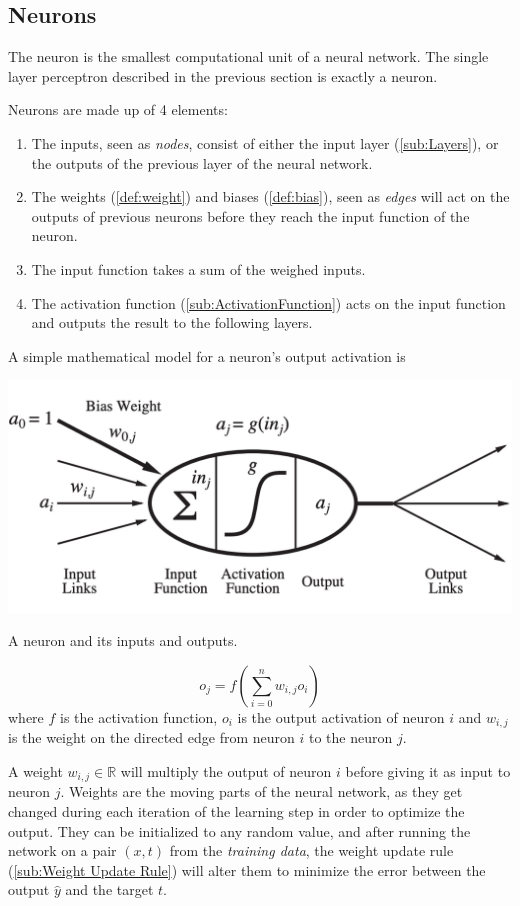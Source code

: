 \documentclass[nobib]{tufte-handout} %
\begin{document}
 \subsection{Neurons}%
  \label{sub:Neurons}
The neuron is the smallest computational unit of a neural network. The single layer perceptron described in the previous section is exactly a neuron.  
\begin{definition}[Neurons]
  Neurons are made up of 4 elements: 
  \begin{enumerate}
    \item The inputs, seen as \textit{nodes}, consist of either the input layer (\autoref{sub:Layers}), or the outputs of the previous layer of the neural network. 
    \item The weights (\autoref{def:weight}) and biases (\autoref{def:bias}), seen as \textit{edges} will act on the outputs of previous neurons before they reach the input function of the neuron. 
    \item The input function takes a sum of the weighed inputs. 
    \item The activation function (\autoref{sub:ActivationFunction}) acts on the input function and outputs the result to the following layers. 
  \end{enumerate}
   A simple mathematical model for a neuron's output activation is \citep{book:AIModernApp}
\begin{marginfigure}
  \includegraphics{Neuron}
  \label{Neuron}
  \caption{A neuron and its inputs and outputs.}
\end{marginfigure}
  $$o_j = f \left( \sum^{n}_{i=0}w_{i,j} o_i  \right)$$
  where $f$ is the activation function, $o_i$ is the output activation of neuron $i$ and $w_{i,j}$ is the weight on the directed edge from neuron $i$ to the neuron $j$. 
\end{definition}
\begin{definition}[Weights]\label{def:weight}
  A weight $w_{i,j} \in \mathbb{R}$ will multiply the output of neuron $i$ before giving it as input to neuron $j$. Weights are the moving parts of the neural network, as they get changed during each iteration of the learning step in order to optimize the output. They can be initialized to any random value, and after running the network on a pair $(x,t)$ from the \textit{training data}, the weight update rule (\autoref{sub:Weight Update Rule}) will alter them to minimize the error between the output $\hat y$ and the target $t.$ 
\end{definition}
\end{document}
